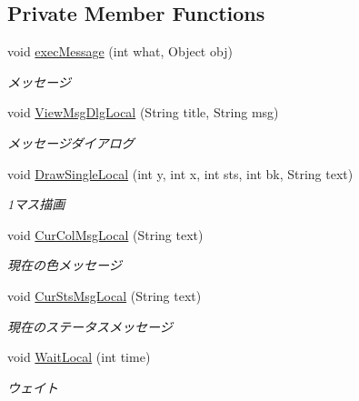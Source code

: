 \subsection*{Private Member Functions}
\begin{DoxyCompactItemize}
\item 
void \mbox{\hyperlink{classjp_1_1gr_1_1java__conf_1_1yuta__yoshinaga_1_1reversi_1_1model_1_1_reversi_play_a8c5c00aeb6656d7806416ac577b77e3b}{exec\+Message}} (int what, Object obj)
\begin{DoxyCompactList}\small\item\em メッセージ \end{DoxyCompactList}\item 
void \mbox{\hyperlink{classjp_1_1gr_1_1java__conf_1_1yuta__yoshinaga_1_1reversi_1_1model_1_1_reversi_play_ae673231f92f3bd36a43acbc713a97513}{View\+Msg\+Dlg\+Local}} (String title, String msg)
\begin{DoxyCompactList}\small\item\em メッセージダイアログ \end{DoxyCompactList}\item 
void \mbox{\hyperlink{classjp_1_1gr_1_1java__conf_1_1yuta__yoshinaga_1_1reversi_1_1model_1_1_reversi_play_a0218c589d8567d52f92ab87bc4bec30f}{Draw\+Single\+Local}} (int y, int x, int sts, int bk, String text)
\begin{DoxyCompactList}\small\item\em 1マス描画 \end{DoxyCompactList}\item 
void \mbox{\hyperlink{classjp_1_1gr_1_1java__conf_1_1yuta__yoshinaga_1_1reversi_1_1model_1_1_reversi_play_a0dec187d4c4372a3470fac8e341ae9e8}{Cur\+Col\+Msg\+Local}} (String text)
\begin{DoxyCompactList}\small\item\em 現在の色メッセージ \end{DoxyCompactList}\item 
void \mbox{\hyperlink{classjp_1_1gr_1_1java__conf_1_1yuta__yoshinaga_1_1reversi_1_1model_1_1_reversi_play_a4c4d14ddaf65d3643bd7edc7b562f4d1}{Cur\+Sts\+Msg\+Local}} (String text)
\begin{DoxyCompactList}\small\item\em 現在のステータスメッセージ \end{DoxyCompactList}\item 
void \mbox{\hyperlink{classjp_1_1gr_1_1java__conf_1_1yuta__yoshinaga_1_1reversi_1_1model_1_1_reversi_play_aec398cf0d2ac7bd1d1b64be67bcadde2}{Wait\+Local}} (int time)
\begin{DoxyCompactList}\small\item\em ウェイト \end{DoxyCompactList}\end{DoxyCompactItemize}

